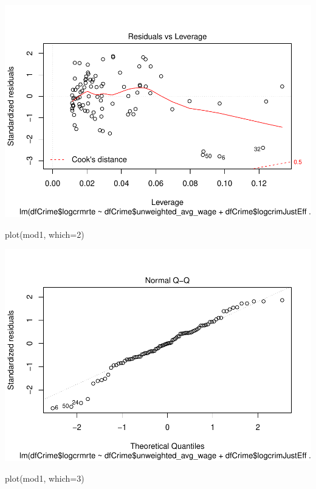 \documentclass[]{article}
\newenvironment{Shaded}{}{}
\newcommand{\DataTypeTok}[1]{#1}
\newcommand{\DecValTok}[1]{#1}
\newcommand{\KeywordTok}[1]{\textcolor[rgb]{0.00,0.00,1.00}{#1}}
\newcommand{\NormalTok}[1]{#1}
\begin{document}
\includegraphics{Bagnard_Gaustad_Hartman_Leung_Lab_3_files/figure-latex/unnamed-chunk-76-1.pdf}

\begin{Shaded}
\begin{Highlighting}[]
\KeywordTok{plot}\NormalTok{(mod1, }\DataTypeTok{which=}\DecValTok{2}\NormalTok{)}
\end{Highlighting}
\end{Shaded}

\includegraphics{Bagnard_Gaustad_Hartman_Leung_Lab_3_files/figure-latex/unnamed-chunk-77-1.pdf}

\begin{Shaded}
\begin{Highlighting}[]
\KeywordTok{plot}\NormalTok{(mod1, }\DataTypeTok{which=}\DecValTok{3}\NormalTok{)}
\end{Highlighting}
\end{Shaded}
\end{document}

